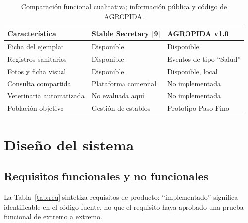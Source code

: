 \documentclass[conference,10pt]{IEEEtran}
\begin{document}
\begin{table}[!t]
\caption{Comparación funcional cualitativa; información pública y código de AGROPIDA.}
\label{tab:comparativo}
\centering\footnotesize
\begin{tabularx}{\columnwidth}{@{}p{2.0cm}YY@{}}\toprule
\textbf{Característica}&\textbf{Stable Secretary [9]}&\textbf{AGROPIDA v1.0}\tabularnewline\midrule
Ficha del ejemplar&Disponible&Disponible\tabularnewline
Registros sanitarios&Disponible&Eventos de tipo ``Salud''\tabularnewline
Fotos y ficha visual&Disponible&Disponible, local\tabularnewline
Consulta compartida&Plataforma comercial&No implementada\tabularnewline
Veterinaria automatizada&No evaluada aquí&No implementada\tabularnewline
Población objetivo&Gestión de establos&Prototipo Paso Fino\tabularnewline\bottomrule
\end{tabularx}
\end{table}

\section{Diseño del sistema}
\subsection{Requisitos funcionales y no funcionales}
La Tabla~\ref{tab:req} sintetiza requisitos de producto: ``implementado'' significa identificable en el código fuente, no que el requisito haya aprobado una prueba funcional de extremo a extremo.
\end{document}
